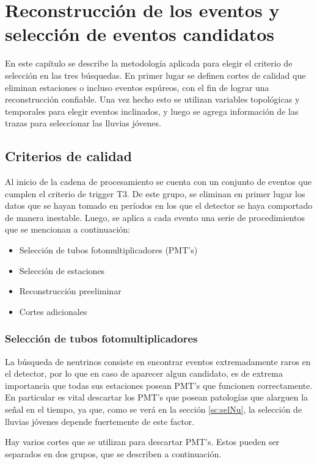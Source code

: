 \chapter{Reconstrucci\'on de los eventos  y selecci\'on de eventos candidatos}
\label{ch:selAuger}

En este capítulo se describe la metodología aplicada para elegir el criterio de selección en las tres búsquedas.
En primer lugar se definen cortes de calidad que eliminan estaciones o incluso eventos espúreos, con el fin de lograr una reconstrucción confiable.
Una vez hecho esto se utilizan variables topológicas y temporales para elegir eventos inclinados, y luego  se agrega información de las trazas para seleccionar las lluvias jóvenes.

\section{Criterios de calidad}

	Al inicio de la cadena de procesamiento se cuenta con un conjunto de eventos que cumplen el criterio de trigger T3.
	De este grupo, se eliminan en primer lugar los datos que se hayan tomado en períodos en los que el detector se haya comportado de manera inestable.
	Luego, se aplica a cada evento una serie de procedimientos que se mencionan a continuación:
	\begin{itemize}
	 \item Selección de tubos fotomultiplicadores (PMT's)
	 \item Selección de estaciones
	 \item Reconstrucción preeliminar
	 \item Cortes adicionales
	\end{itemize}
	
	\subsection{Selección de tubos fotomultiplicadores}
	
	La búsqueda de neutrinos consiste en encontrar eventos extremadamente raros en el detector, por lo que en caso de aparecer algun candidato, es de extrema importancia que todas sus estaciones posean PMT's que funcionen correctamente.
	En particular es vital descartar los PMT's que posean patologías que alarguen la señal en el tiempo, ya que, como se verá en la sección \ref{sc:selNu}, la selección de lluvias jóvenes depende fuertemente de este factor.
	
	Hay varios cortes que se utilizan para descartar PMT's. 
	Estos pueden ser separados en dos grupos, que se describen a continuación.
	
